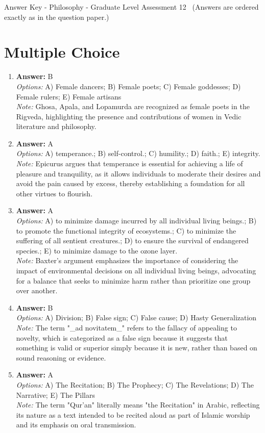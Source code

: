 \documentclass[12pt]{article}
\begin{document}
\begin{center}
Answer Key - Philosophy - Graduate Level Assessment 12 \
\small (Answers are ordered exactly as in the question paper.)
\end{center}

\section*{Multiple Choice}
\begin{enumerate}[label=\arabic*.]
\item \textbf{Answer:} B
\\ \textit{Options:} A) Female dancers; B) Female poets; C) Female goddesses; D) Female rulers; E) Female artisans
\\ \textit{Note:} Ghosa, Apala, and Lopamurda are recognized as female poets in the Rigveda, highlighting the presence and contributions of women in Vedic literature and philosophy.
\item \textbf{Answer:} A
\\ \textit{Options:} A) temperance.; B) self-control.; C) humility.; D) faith.; E) integrity.
\\ \textit{Note:} Epicurus argues that temperance is essential for achieving a life of pleasure and tranquility, as it allows individuals to moderate their desires and avoid the pain caused by excess, thereby establishing a foundation for all other virtues to flourish.
\item \textbf{Answer:} A
\\ \textit{Options:} A) to minimize damage incurred by all individual living beings.; B) to promote the functional integrity of ecosystems.; C) to minimize the suffering of all sentient creatures.; D) to ensure the survival of endangered species.; E) to minimize damage to the ozone layer.
\\ \textit{Note:} Baxter's argument emphasizes the importance of considering the impact of environmental decisions on all individual living beings, advocating for a balance that seeks to minimize harm rather than prioritize one group over another.
\item \textbf{Answer:} B
\\ \textit{Options:} A) Division; B) False sign; C) False cause; D) Hasty Generalization
\\ \textit{Note:} The term "\_ad novitatem\_" refers to the fallacy of appealing to novelty, which is categorized as a false sign because it suggests that something is valid or superior simply because it is new, rather than based on sound reasoning or evidence.
\item \textbf{Answer:} A
\\ \textit{Options:} A) The Recitation; B) The Prophecy; C) The Revelations; D) The Narrative; E) The Pillars
\\ \textit{Note:} The term "Qur'an" literally means "the Recitation" in Arabic, reflecting its nature as a text intended to be recited aloud as part of Islamic worship and its emphasis on oral transmission.
\end{enumerate}
\end{document}
